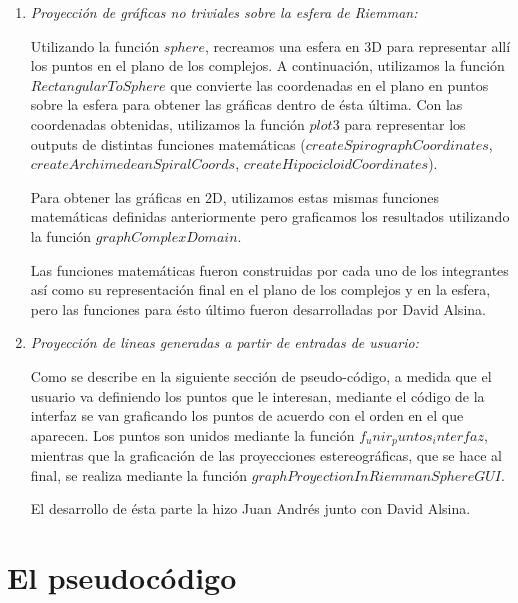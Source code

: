 \documentclass[a4paper,12pt]{article}
\begin{document}
    \begin{enumerate}
        \item \textit{Proyección de gráficas no triviales sobre la esfera de Riemman:} 
        
        Utilizando la función $sphere$, recreamos una esfera en 3D para representar allí los puntos en el plano de los complejos. A continuación, utilizamos la función $RectangularToSphere$ que convierte las coordenadas en el plano en puntos sobre la esfera para obtener las gráficas dentro de ésta última. Con las coordenadas obtenidas, utilizamos la función $plot3$ para representar los outputs de distintas funciones matemáticas ($createSpirographCoordinates$, $createArchimedeanSpiralCoords$, $createHipocicloidCoordinates$).
        
        Para obtener las gráficas en 2D, utilizamos estas mismas funciones matemáticas definidas anteriormente pero graficamos los resultados utilizando la función $graphComplexDomain$. 
        
        Las funciones matemáticas fueron construidas por cada uno de los integrantes así como su representación final en el plano de los complejos y en la esfera, pero las funciones para ésto último fueron desarrolladas por David Alsina.
        
        \item \textit{Proyección de lineas generadas a partir de entradas de usuario:}
        
        Como se describe en la siguiente sección de pseudo-código, a medida que el usuario va definiendo los puntos que le interesan, mediante el código de la interfaz se van graficando los puntos de acuerdo con el orden en el que aparecen. Los puntos son unidos mediante la función $f_unir_puntos_interfaz$, mientras que la graficación de las proyecciones estereográficas, que se hace al final, se realiza mediante la función $graphProyectionInRiemmanSphereGUI$.
        
        El desarrollo de ésta parte la hizo Juan Andrés junto con David Alsina.
        
    \end{enumerate}
    
    \section{El pseudocódigo}
    
\end{document}
